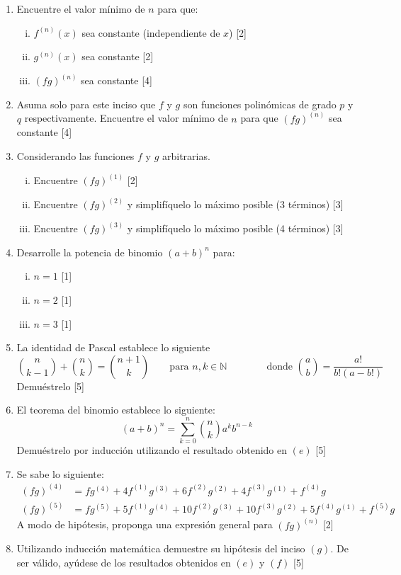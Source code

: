 \documentclass[spanish,12pt]{article}
\begin{document}
\begin{enumerate}[$a)$]
    \item Encuentre el valor mínimo de $n$ para que:
    \begin{enumerate}[i)]
        \item $f^{(n)}(x)$ sea constante (independiente de $x$) [2]
        \item $g^{(n)}(x)$ sea constante [2]
        \item $(fg)^{(n)}$ sea constante [4]
    \end{enumerate}
    \item Asuma solo para este inciso que $f$ y $g$ son funciones polinómicas de grado $p$ y $q$ respectivamente. Encuentre el valor mínimo de $n$ para que $(fg)^{(n)}$ sea constante [4]
    \item Considerando las funciones $f$ y $g$ arbitrarias.
    \begin{enumerate}[i)]
        \item Encuentre $(fg)^{(1)}$ [2]
        \item Encuentre $(fg)^{(2)}$ y simplifíquelo lo máximo posible (3 términos) [3]
        \item Encuentre $(fg)^{(3)}$ y simplifíquelo lo máximo posible (4 términos) [3]
    \end{enumerate}
    \item Desarrolle la potencia de binomio $(a+b)^n$ para:
    \begin{enumerate}[i)]
        \item $n=1$ [1]
        \item $n=2$ [1]
        \item $n=3$ [1]
    \end{enumerate}
    \item La identidad de Pascal establece lo siguiente
    $${n\choose{k-1}}+{n\choose{k}}={{n+1}\choose{k}}\quad\quad \text{para }n,k\in\mathbb{N} \quad\quad\quad\quad \text{donde } {a\choose{b}}=\frac{a!}{b!(a-b!)}$$
    Demuéstrelo [5]
    \item El teorema del binomio establece lo siguiente:
    $$(a+b)^n=\sum_{k=0}^n{n\choose{k}}a^kb^{n-k}$$
    Demuéstrelo por inducción utilizando el resultado obtenido en $(e)$ [5]
    \item Se sabe lo siguiente:
    \begin{align*}
        (fg)^{(4)}&=fg^{(4)}+4f^{(1)}g^{(3)}+6f^{(2)}g^{(2)}+4f^{(3)}g^{(1)}+f^{(4)}g\\
        (fg)^{(5)}&=fg^{(5)}+5f^{(1)}g^{(4)}+10f^{(2)}g^{(3)}+10f^{(3)}g^{(2)}+5f^{(4)}g^{(1)}+f^{(5)}g
    \end{align*}
    A modo de hipótesis, proponga una expresión general para $(fg)^{(n)}$ [2]
    \item Utilizando inducción matemática demuestre su hipótesis del inciso $(g)$. De ser válido, ayúdese de los resultados obtenidos en $(e)$ y $(f)$ [5]
\end{enumerate}
\end{document}

